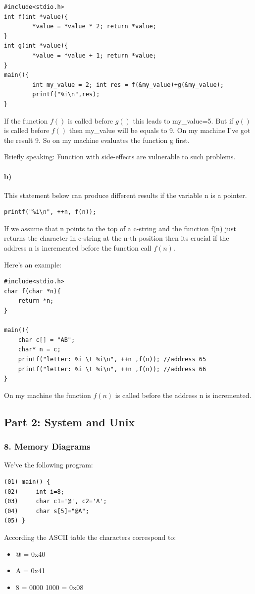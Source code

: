 \documentclass[12pt]{article}
\begin{document}
\begin{lstlisting}
#include<stdio.h>
int f(int *value){ 
        *value = *value * 2; return *value; 
}
int g(int *value){ 
        *value = *value + 1; return *value; 
}
main(){
        int my_value = 2; int res = f(&my_value)+g(&my_value);
        printf("%i\n",res);
}
\end{lstlisting}

If the function $f()$ is called before $g()$ this leads to my\_value=5. But if $g()$ is called before $f()$ then my\_value will be equals to 9.
On my machine I've got the result 9. So on my machine evaluates the function g first.

Briefly speaking: Function with side-effects are vulnerable to such problems.

\paragraph{b)}
This statement below can produce different results if the variable n is a pointer.
\begin{lstlisting}
printf("%i\n", ++n, f(n));
\end{lstlisting}

If we assume that n points to the top of a c-string and the function f(n) just returns the character in c-string at the n-th position then its crucial if the address n is incremented before the function call $f(n)$.

Here's an example:
\begin{lstlisting}
#include<stdio.h>
char f(char *n){
	return *n;
}

main(){
	char c[] = "AB";
	char* n = c;
	printf("letter: %i \t %i\n", ++n ,f(n)); //address 65
	printf("letter: %i \t %i\n", ++n ,f(n)); //address 66
}
\end{lstlisting}
On my machine the function $f(n)$ is called before the address n is incremented.

\subsection*{Part 2: System and Unix}
\subsubsection*{8. Memory Diagrams}
We've the following program:
\begin{lstlisting}
(01) main() {
(02)     int i=8;
(03)     char c1='@', c2='A';
(04)     char s[5]="@A";
(05) }
\end{lstlisting}
According the ASCII table the characters correspond to:
\begin{itemize}[noitemsep]
\item @ = 0x40
\item A = 0x41
\item 8 = 0000 1000 = 0x08
\end{itemize}
\end{document}

